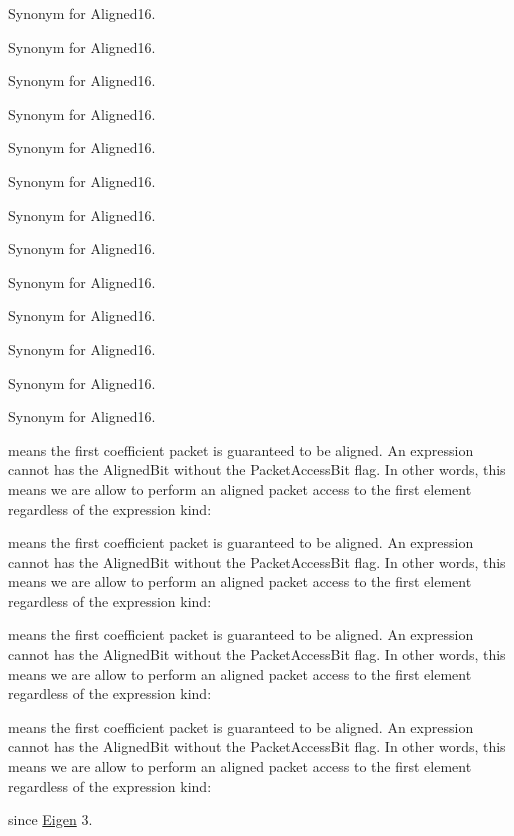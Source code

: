 
\begin{DoxyRefList}
\item[\label{deprecated__deprecated000014}%
\Hypertarget{deprecated__deprecated000014}%
Member \hyperlink{group__enums_gga45fe06e29902b7a2773de05ba27b47a1ad37d4c71425bb286e9b4103830538fbf}{Eigen\+:\+:Aligned} ]Synonym for Aligned16. 

Synonym for Aligned16. 

Synonym for Aligned16. 

Synonym for Aligned16. 

Synonym for Aligned16. 

Synonym for Aligned16. 

Synonym for Aligned16. 

Synonym for Aligned16. 

Synonym for Aligned16. 

Synonym for Aligned16. 

Synonym for Aligned16. 

Synonym for Aligned16. 

Synonym for Aligned16.  
\item[\label{deprecated__deprecated000013}%
\Hypertarget{deprecated__deprecated000013}%
Member \hyperlink{group__flags_gac5795adacd266512a26890973503ed88}{Eigen\+:\+:Aligned\+Bit} ]

means the first coefficient packet is guaranteed to be aligned. An expression cannot has the Aligned\+Bit without the Packet\+Access\+Bit flag. In other words, this means we are allow to perform an aligned packet access to the first element regardless of the expression kind\+: 



means the first coefficient packet is guaranteed to be aligned. An expression cannot has the Aligned\+Bit without the Packet\+Access\+Bit flag. In other words, this means we are allow to perform an aligned packet access to the first element regardless of the expression kind\+: 



means the first coefficient packet is guaranteed to be aligned. An expression cannot has the Aligned\+Bit without the Packet\+Access\+Bit flag. In other words, this means we are allow to perform an aligned packet access to the first element regardless of the expression kind\+: 



means the first coefficient packet is guaranteed to be aligned. An expression cannot has the Aligned\+Bit without the Packet\+Access\+Bit flag. In other words, this means we are allow to perform an aligned packet access to the first element regardless of the expression kind\+:  
\item[\label{deprecated__deprecated000025}%
\Hypertarget{deprecated__deprecated000025}%
Member \hyperlink{group___geometry___module_a774ef355da13d6bee6a6e7244c15231a}{Eigen\+:\+:Aligned\+Box$<$ \+\_\+\+Scalar, \+\_\+\+Ambient\+Dim $>$\+:\+:Index} ]since \hyperlink{namespace_eigen}{Eigen} 3. 


\end{DoxyRefList}
